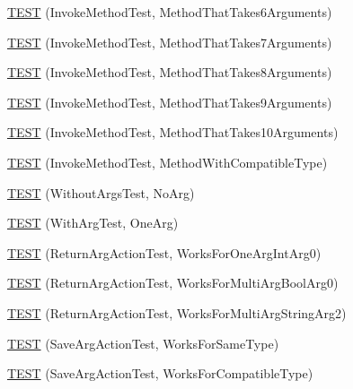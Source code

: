 \begin{DoxyCompactItemize}
\item 
\hyperlink{namespacetesting_1_1gmock__more__actions__test_a715c088109e141aa577e497e3729b98b}{T\+E\+ST} (Invoke\+Method\+Test, Method\+That\+Takes6\+Arguments)
\item 
\hyperlink{namespacetesting_1_1gmock__more__actions__test_a1f11171c55d049143c980502213e0b11}{T\+E\+ST} (Invoke\+Method\+Test, Method\+That\+Takes7\+Arguments)
\item 
\hyperlink{namespacetesting_1_1gmock__more__actions__test_a5bfedd2255bbfe7ffcbc76ec581b2ff6}{T\+E\+ST} (Invoke\+Method\+Test, Method\+That\+Takes8\+Arguments)
\item 
\hyperlink{namespacetesting_1_1gmock__more__actions__test_acdcc7f6a35e6373f3d0b3a71f98c418b}{T\+E\+ST} (Invoke\+Method\+Test, Method\+That\+Takes9\+Arguments)
\item 
\hyperlink{namespacetesting_1_1gmock__more__actions__test_a14b55eb4c0d0b3149e269eea1443cb58}{T\+E\+ST} (Invoke\+Method\+Test, Method\+That\+Takes10\+Arguments)
\item 
\hyperlink{namespacetesting_1_1gmock__more__actions__test_adb0c29d688c079ad5bf07d5a0bd72aea}{T\+E\+ST} (Invoke\+Method\+Test, Method\+With\+Compatible\+Type)
\item 
\hyperlink{namespacetesting_1_1gmock__more__actions__test_a68748f21021e787dfdc095691c94d495}{T\+E\+ST} (Without\+Args\+Test, No\+Arg)
\item 
\hyperlink{namespacetesting_1_1gmock__more__actions__test_a40664c1acdc3650e8edf9a9a49b008de}{T\+E\+ST} (With\+Arg\+Test, One\+Arg)
\item 
\hyperlink{namespacetesting_1_1gmock__more__actions__test_a717ea38d7b78b6d51b4d617ed317d26e}{T\+E\+ST} (Return\+Arg\+Action\+Test, Works\+For\+One\+Arg\+Int\+Arg0)
\item 
\hyperlink{namespacetesting_1_1gmock__more__actions__test_a0705d7e6083d129caae9d91cc5d6d570}{T\+E\+ST} (Return\+Arg\+Action\+Test, Works\+For\+Multi\+Arg\+Bool\+Arg0)
\item 
\hyperlink{namespacetesting_1_1gmock__more__actions__test_ae280b3b95b0cdfcf7b81de95c8fe942d}{T\+E\+ST} (Return\+Arg\+Action\+Test, Works\+For\+Multi\+Arg\+String\+Arg2)
\item 
\hyperlink{namespacetesting_1_1gmock__more__actions__test_a511b9c6721629465fd1e2fbd65633ef9}{T\+E\+ST} (Save\+Arg\+Action\+Test, Works\+For\+Same\+Type)
\item 
\hyperlink{namespacetesting_1_1gmock__more__actions__test_a2b92b573de73fdf97dad4da8a67d7fc0}{T\+E\+ST} (Save\+Arg\+Action\+Test, Works\+For\+Compatible\+Type)

\end{DoxyCompactItemize}
